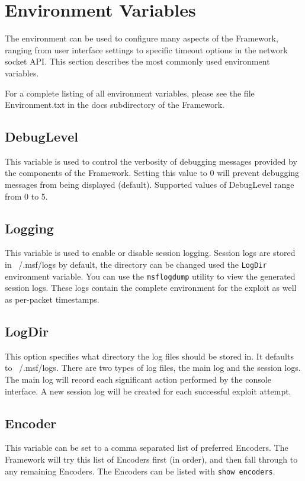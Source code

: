 \documentclass{report}
\begin{document}
    \section{Environment Variables}
    \label{ENV-VAR}
\par
The environment can be used to configure many aspects of the Framework, ranging
from user interface settings to specific timeout options in the network socket
API. This section describes the most commonly used environment variables.  

\par
For a complete listing of all environment variables, please see the file
Environment.txt in the docs subdirectory of the Framework. 


	\subsection{DebugLevel}
\par
This variable is used to control the verbosity of debugging messages provided by
the components of the Framework. Setting this value to 0 will prevent debugging
messages from being displayed (default). Supported values of DebugLevel range from 0 to 5. 

	\subsection{Logging}
\par
This variable is used to enable or disable session logging. Session logs are
stored in ~/.msf/logs by default, the directory can be changed used the
\texttt{LogDir} environment variable. You can use the \texttt{msflogdump}
utility to view the generated session logs. These logs contain the complete
environment for the exploit as well as per-packet timestamps.  

	\subsection{LogDir}
\par
This option specifies what directory the log files should be stored in. It
defaults to ~/.msf/logs. There are two types of log files, the main log and the
session logs. The main log will record each significant action performed by the
console interface. A new session log will be created for each successful exploit
attempt.  

	\subsection{Encoder}
\par
This variable can be set to a comma separated list of preferred Encoders. The
Framework will try this list of Encoders first (in order), and then fall through
to any remaining Encoders. The Encoders can be listed with \texttt{show encoders}.  
\end{document}
